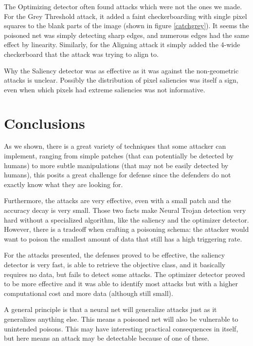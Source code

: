 \documentclass[letterpaper, 10 pt, conference]{ieeeconf}  %
\begin{document}
The Optimizing detector often found attacks which were not the ones we
made.  For the Grey Threshold attack, it added a faint checkerboarding
with single pixel squares to the blank parts of the image (shown in
figure \ref{catchgrey}).  It seems
the poisoned net was simply detecting sharp edges, and numerous edges
had the same effect by linearity.  Similarly, for the Aligning attack
it simply added the 4-wide checkerboard that the attack was trying to
align to.

Why the Saliency detector was as effective as it was against the
non-geometric attacks is unclear.  Possibly the distribution of pixel
saliencies was itself a sign, even when {\textit which} pixels had
extreme saliencies was not informative.

\section{Conclusions}

As we shown, there is a great variety of techniques that some attacker can
implement, ranging from simple patches (that can potentially be detected by
humans) to more subtle manipulations (that may not be easily detected
by humans), this posits a great challenge for defense since the defenders do
not exactly know what they are looking for.

Furthermore, the attacks are very effective, even with a small patch and the
accuracy decay is very small. Those two facts make Neural Trojan detection
very hard without a specialized algorithm, like the saliency and the
optimizer detector. However, there is a tradeoff when crafting a poisoning
schema: the attacker would want to poison the smallest amount of data that still
has a high triggering rate.


For the attacks presented, the defenses proved to be effective, the saliency
detector is very fast, is able to retrieve the objective class, and it basically
requires no data, but fails to detect some attacks. The optimizer detector proved
to be more effective and it was able to identify most attacks but with a
higher computational cost and more data (although still small).

A general principle is that a neural net will generalize attacks just
as it generalizes anything else.  This means a poisoned net will also
be vulnerable to unintended poisons.  This may have interesting
practical consequences in itself, but here means an attack may be
detectable because of one of these.
\end{document}
